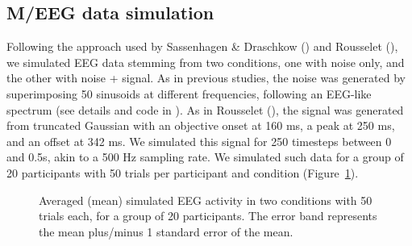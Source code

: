 \documentclass[
  doc,
  floatsintext,
  longtable,
  a4paper,
  nolmodern,
  notxfonts,
  notimes,
  colorlinks=true,linkcolor=blue,citecolor=blue,urlcolor=blue]{apa7}
\begin{document}
\subsection{M/EEG data simulation}\label{meeg-data-simulation}

Following the approach used by Sassenhagen \& Draschkow
() and Rousselet
(), we simulated EEG data
stemming from two conditions, one with noise only, and the other with
noise + signal. As in previous studies, the noise was generated by
superimposing 50 sinusoids at different frequencies, following an
EEG-like spectrum (see details and code in
). As in Rousselet
(), the signal was generated
from truncated Gaussian with an objective onset at 160 ms, a peak at 250
ms, and an offset at 342 ms. We simulated this signal for 250 timesteps
between 0 and 0.5s, akin to a 500 Hz sampling rate. We simulated such
data for a group of 20 participants with 50 trials per participant and
condition (Figure~\ref{fig-eeg}).

\begin{figure}[!htb]

\caption{\label{fig-eeg}Averaged (mean) simulated EEG activity in two
conditions with 50 trials each, for a group of 20 participants. The
error band represents the mean plus/minus 1 standard error of the mean.}


\end{figure}%
\end{document}
